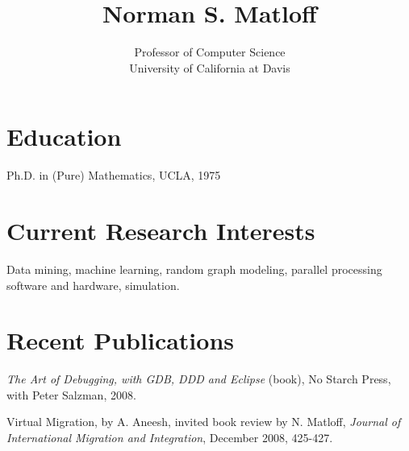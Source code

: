 \documentclass[11pt]{article}
\begin{document}
% 

\title{Norman S. Matloff}

\author{Professor of Computer Science \\
University of California at Davis} 

\date{}

\maketitle

\section*{Education } 

Ph.D. in (Pure) Mathematics, UCLA, 1975

% 
% 
% 
% 

\section*{Current Research Interests} 

Data mining, machine learning, random graph modeling, parallel
processing software and hardware, simulation.

\section*{Recent Publications} 

{\it The Art of Debugging, with GDB, DDD and Eclipse} (book), No Starch
Press, with Peter Salzman, 2008.

Virtual Migration, by A. Aneesh, invited book review by N. Matloff, {\it
Journal of International Migration and Integration}, December 2008,
425-427.
\end{document}
